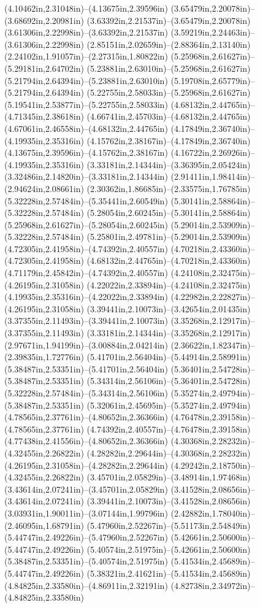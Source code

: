 (4.10462in,2.31048in)--(4.13675in,2.39596in) (3.65479in,2.20078in)--(3.68692in,2.20981in) (3.63392in,2.21537in)--(3.65479in,2.20078in) (3.61306in,2.22998in)--(3.63392in,2.21537in) (3.59219in,2.24463in)--(3.61306in,2.22998in) (2.85151in,2.02659in)--(2.88364in,2.13140in) (2.24102in,1.91057in)--(2.27315in,1.80822in) (5.25968in,2.61627in)--(5.29181in,2.64702in) (5.23881in,2.63010in)--(5.25968in,2.61627in) (5.21794in,2.64394in)--(5.23881in,2.63010in) (5.19708in,2.65779in)--(5.21794in,2.64394in) (5.22755in,2.58033in)--(5.25968in,2.61627in) (5.19541in,2.53877in)--(5.22755in,2.58033in) (4.68132in,2.44765in)--(4.71345in,2.38618in) (4.66741in,2.45703in)--(4.68132in,2.44765in) (4.67061in,2.46558in)--(4.68132in,2.44765in) (4.17849in,2.36740in)--(4.19935in,2.35316in) (4.15762in,2.38167in)--(4.17849in,2.36740in) (4.13675in,2.39596in)--(4.15762in,2.38167in) (4.16722in,2.26926in)--(4.19935in,2.35316in) (3.33181in,2.14344in)--(3.36395in,2.05424in) (3.32486in,2.14820in)--(3.33181in,2.14344in) (2.91411in,1.98414in)--(2.94624in,2.08661in) (2.30362in,1.86685in)--(2.33575in,1.76785in) (5.32228in,2.57484in)--(5.35441in,2.60549in) (5.30141in,2.58864in)--(5.32228in,2.57484in) (5.28054in,2.60245in)--(5.30141in,2.58864in) (5.25968in,2.61627in)--(5.28054in,2.60245in) (5.29014in,2.53909in)--(5.32228in,2.57484in) (5.25801in,2.49781in)--(5.29014in,2.53909in) (4.72305in,2.41958in)--(4.74392in,2.40557in) (4.70218in,2.43360in)--(4.72305in,2.41958in) (4.68132in,2.44765in)--(4.70218in,2.43360in) (4.71179in,2.45842in)--(4.74392in,2.40557in) (4.24108in,2.32475in)--(4.26195in,2.31058in) (4.22022in,2.33894in)--(4.24108in,2.32475in) (4.19935in,2.35316in)--(4.22022in,2.33894in) (4.22982in,2.22827in)--(4.26195in,2.31058in) (3.39441in,2.10073in)--(3.42654in,2.01435in) (3.37355in,2.11493in)--(3.39441in,2.10073in) (3.35268in,2.12917in)--(3.37355in,2.11493in) (3.33181in,2.14344in)--(3.35268in,2.12917in) (2.97671in,1.94199in)--(3.00884in,2.04214in) (2.36622in,1.82347in)--(2.39835in,1.72776in) (5.41701in,2.56404in)--(5.44914in,2.58991in) (5.38487in,2.53351in)--(5.41701in,2.56404in) (5.36401in,2.54728in)--(5.38487in,2.53351in) (5.34314in,2.56106in)--(5.36401in,2.54728in) (5.32228in,2.57484in)--(5.34314in,2.56106in) (5.35274in,2.49794in)--(5.38487in,2.53351in) (5.32061in,2.45695in)--(5.35274in,2.49794in) (4.78565in,2.37761in)--(4.80652in,2.36366in) (4.76478in,2.39158in)--(4.78565in,2.37761in) (4.74392in,2.40557in)--(4.76478in,2.39158in) (4.77438in,2.41556in)--(4.80652in,2.36366in) (4.30368in,2.28232in)--(4.32455in,2.26822in) (4.28282in,2.29644in)--(4.30368in,2.28232in) (4.26195in,2.31058in)--(4.28282in,2.29644in) (4.29242in,2.18750in)--(4.32455in,2.26822in) (3.45701in,2.05829in)--(3.48914in,1.97468in) (3.43614in,2.07241in)--(3.45701in,2.05829in) (3.41528in,2.08656in)--(3.43614in,2.07241in) (3.39441in,2.10073in)--(3.41528in,2.08656in) (3.03931in,1.90011in)--(3.07144in,1.99796in) (2.42882in,1.78040in)--(2.46095in,1.68791in) (5.47960in,2.52267in)--(5.51173in,2.54849in) (5.44747in,2.49226in)--(5.47960in,2.52267in) (5.42661in,2.50600in)--(5.44747in,2.49226in) (5.40574in,2.51975in)--(5.42661in,2.50600in) (5.38487in,2.53351in)--(5.40574in,2.51975in) (5.41534in,2.45689in)--(5.44747in,2.49226in) (5.38321in,2.41621in)--(5.41534in,2.45689in) (4.84825in,2.33580in)--(4.86911in,2.32191in) (4.82738in,2.34972in)--(4.84825in,2.33580in) 